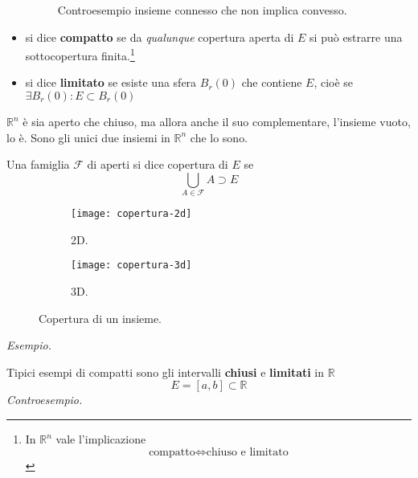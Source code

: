 \documentclass[10pt,a4paper,twoside,openright]{book}
\begin{document}
\begin{itemize}
\begin{figure}[htpb]
	\caption{Controesempio insieme connesso che non implica convesso.}
\end{figure}
\FloatBarrier
\item si dice \textbf{compatto} se da \textit{qualunque} copertura aperta di $E$ si può estrarre una sottocopertura finita.\footnote{In $\displaystyle \mathbb{R}^{n}$ vale l'implicazione
\begin{equation*}
\text{compatto} \Leftrightarrow \text{chiuso e limitato}
\end{equation*}}
\item si dice \textbf{limitato} se esiste una sfera $B_{r}(0)$ che contiene $E$, cioè se $\displaystyle \exists B_{r}(0) :E\subset B_{r}(0)$
\end{itemize}
\begin{nb}
$\mathbb{R}^{n}$ è sia aperto che chiuso, ma allora anche il suo complementare, l'insieme vuoto, lo è. Sono gli unici due insiemi in $\mathbb{R}^{n}$ che lo sono.
\end{nb}
\begin{definition}
[Copertura] Una famiglia $\mathcal{F}$ di aperti si dice copertura di $E$ se
\begin{equation*}
\bigcup _{A\in \mathcal{F}} A\supset E
\end{equation*}
\end{definition}

\begin{figure}[htpb]
     \centering
     \begin{subfigure}[b]{0.45\textwidth}
         \centering
         \texttt{[image: copertura-2d]}
         \caption{2D.}
     \end{subfigure}
     \hfill
     \begin{subfigure}[b]{0.45\textwidth}
         \centering
         \texttt{[image: copertura-3d]}
         \caption{3D.}
     \end{subfigure}
        \caption{Copertura di un insieme.}
\end{figure}

\textit{Esempio.}

Tipici esempi di compatti sono gli intervalli \textbf{chiusi} e \textbf{limitati} in $\mathbb{R}$
\begin{equation*}
E=[ a,b] \subset \mathbb{R}
\end{equation*}
\textit{Controesempio.}
\end{document}
